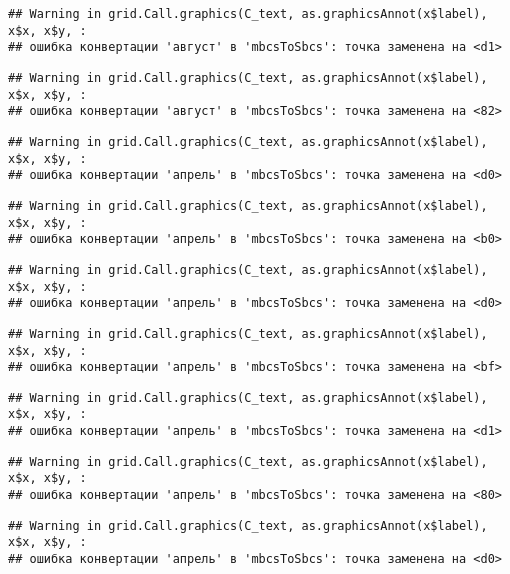 \documentclass[
]{article}
\begin{document}
\begin{verbatim}
## Warning in grid.Call.graphics(C_text, as.graphicsAnnot(x$label), x$x, x$y, :
## ошибка конвертации 'август' в 'mbcsToSbcs': точка заменена на <d1>
\end{verbatim}

\begin{verbatim}
## Warning in grid.Call.graphics(C_text, as.graphicsAnnot(x$label), x$x, x$y, :
## ошибка конвертации 'август' в 'mbcsToSbcs': точка заменена на <82>
\end{verbatim}

\begin{verbatim}
## Warning in grid.Call.graphics(C_text, as.graphicsAnnot(x$label), x$x, x$y, :
## ошибка конвертации 'апрель' в 'mbcsToSbcs': точка заменена на <d0>
\end{verbatim}

\begin{verbatim}
## Warning in grid.Call.graphics(C_text, as.graphicsAnnot(x$label), x$x, x$y, :
## ошибка конвертации 'апрель' в 'mbcsToSbcs': точка заменена на <b0>
\end{verbatim}

\begin{verbatim}
## Warning in grid.Call.graphics(C_text, as.graphicsAnnot(x$label), x$x, x$y, :
## ошибка конвертации 'апрель' в 'mbcsToSbcs': точка заменена на <d0>
\end{verbatim}

\begin{verbatim}
## Warning in grid.Call.graphics(C_text, as.graphicsAnnot(x$label), x$x, x$y, :
## ошибка конвертации 'апрель' в 'mbcsToSbcs': точка заменена на <bf>
\end{verbatim}

\begin{verbatim}
## Warning in grid.Call.graphics(C_text, as.graphicsAnnot(x$label), x$x, x$y, :
## ошибка конвертации 'апрель' в 'mbcsToSbcs': точка заменена на <d1>
\end{verbatim}

\begin{verbatim}
## Warning in grid.Call.graphics(C_text, as.graphicsAnnot(x$label), x$x, x$y, :
## ошибка конвертации 'апрель' в 'mbcsToSbcs': точка заменена на <80>
\end{verbatim}

\begin{verbatim}
## Warning in grid.Call.graphics(C_text, as.graphicsAnnot(x$label), x$x, x$y, :
## ошибка конвертации 'апрель' в 'mbcsToSbcs': точка заменена на <d0>
\end{verbatim}
\end{document}
